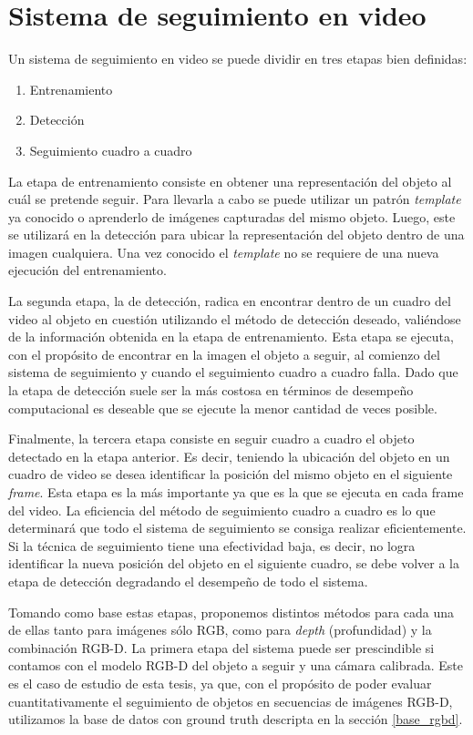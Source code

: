 \chapter{Sistema de seguimiento en video}

Un sistema de seguimiento en video se puede dividir en tres etapas bien definidas:
\begin{enumerate}
 \item Entrenamiento
 \item Detección
 \item Seguimiento cuadro a cuadro
\end{enumerate}

La etapa de entrenamiento consiste en obtener una representación del objeto al cuál se pretende seguir. Para llevarla a cabo se puede utilizar un patrón \textit{template} ya conocido o aprenderlo de imágenes capturadas del mismo objeto. Luego, este se utilizará en la detección para ubicar la representación del objeto dentro de una imagen cualquiera. Una vez conocido el \textit{template} no se requiere de una nueva ejecución del entrenamiento.

La segunda etapa, la de detección, radica en encontrar dentro de un cuadro del video al objeto en cuestión utilizando el método de detección deseado, valiéndose de la información obtenida en la etapa de entrenamiento. Esta etapa se ejecuta, con el propósito de encontrar en la imagen el objeto a seguir, al comienzo del sistema de seguimiento y cuando el seguimiento cuadro a cuadro falla. Dado que la etapa de detección suele ser la más costosa en términos de desempeño computacional es deseable que se ejecute la menor cantidad de veces posible.

Finalmente, la tercera etapa consiste en seguir cuadro a cuadro el objeto detectado en la etapa anterior. Es decir, teniendo la ubicación del objeto en un cuadro de video se desea identificar la posición del mismo objeto en el siguiente \textit{frame}. Esta etapa es la más importante ya que es la que se ejecuta en cada frame del video. La eficiencia del método de seguimiento cuadro a cuadro es lo que determinará que todo el sistema de seguimiento se consiga realizar eficientemente. Si la técnica de seguimiento tiene una efectividad baja, es decir, no logra identificar la nueva posición del objeto en el siguiente cuadro, se debe volver a la etapa de detección degradando el desempeño de todo el sistema.

Tomando como base estas etapas, proponemos distintos métodos para cada una de ellas tanto para imágenes sólo RGB, como para \textit{depth} (profundidad) y la combinación RGB-D. La primera etapa del sistema puede ser prescindible si contamos con el modelo RGB-D del objeto a seguir y una cámara calibrada. Este es el caso de estudio de esta tesis, ya que, con el propósito de poder evaluar cuantitativamente el seguimiento de objetos en secuencias de imágenes RGB-D, utilizamos la base de datos con ground truth descripta en la sección \ref{base_rgbd}.

